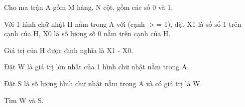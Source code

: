 Cho ma trận A gồm M hàng, N cột, gồm các số 0 và 1.

Với 1 hình chữ nhật H nằm trong A với (cạnh $>$= 1), đặt X1 là số số 1 trên cạnh của H, X0 là số lượng số 0 nằm trên cạnh của H.

Giá trị của H được định nghĩa là X1 - X0.

Đặt W là giá trị lớn nhất của 1 hình chữ nhật nằm trong A.

Đặt S là số lượng hình chữ nhật nằm trong A và có giá trị là W.

Tìm W và S.

\